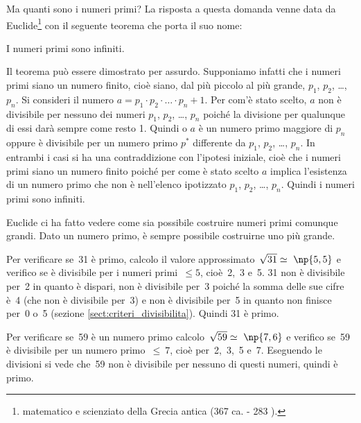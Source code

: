 \ovalbox{\risolvii \ref{ese:1.15},\ref{ese:1.16}}\vspazio

Ma quanti sono i numeri primi? La risposta a questa domanda venne data da Euclide\footnote{matematico e scienziato della Grecia antica (367 \aC{} ca. - 283 \aC).} con il seguente teorema
che porta il suo nome:
\begin{teorema}[di Euclide]
I numeri primi sono infiniti.
\end{teorema}

Il teorema può essere dimostrato per assurdo.
Supponiamo infatti che i numeri primi siano un numero finito, cioè siano, dal più piccolo al più grande, $p_1$, $p_2$, \ldots{}, $p_n$. Si consideri il numero $a=p_1\cdot p_2\cdot \ldots{}\cdot p_n+1$. Per com'è stato scelto, $a$ non è divisibile per nessuno dei numeri $p_1$, $p_2$, \ldots{}, $p_n$ poiché la divisione per qualunque di essi darà sempre come resto 1. Quindi o $a$ è un numero primo maggiore di $p_n$ oppure è divisibile per un numero primo $p^*$ differente da $p_1$, $p_2$, \ldots{}, $p_n$. In entrambi i casi si ha una contraddizione con l'ipotesi iniziale, cioè che i numeri primi siano un numero finito poiché per come è stato scelto $a$ implica l'esistenza di un numero primo che non è nell'elenco ipotizzato $p_1$, $p_2$, \ldots, $p_n$. Quindi i numeri primi sono infiniti.

Euclide ci ha fatto vedere come sia possibile costruire numeri primi comunque grandi. Dato un numero primo,
è sempre possibile costruirne uno più grande.

\vspazio\ovalbox{\risolvi \ref{ese:1.17}}

\begin{exrig}
 \begin{esempio}
 Per verificare se~31 è primo, calcolo il valore approssimato~$\sqrt{31}\simeq~\np{5,5}$ e verifico se è divisibile
per i numeri primi~$\le5$, cioè~2,~3 e~5. 31 non è divisibile per~2 in
quanto è dispari, non è divisibile per~3 poiché la somma delle sue cifre è~4 (che non è divisibile per~3) e
non è divisibile per~5 in quanto non finisce per~0 o~5 (sezione \ref{sect:criteri_divisibilita}). Quindi 31 è primo.
 \end{esempio}

 \begin{esempio}
 Per verificare se~59 è un numero primo calcolo~$\sqrt{59}\simeq~\np{7,6}$ e verifico se~59 è divisibile per un
numero primo~$\le~7$, cioè per~2,~3,~5 e~7. Eseguendo le divisioni si vede che~59 non è divisibile
per nessuno di questi numeri, quindi è primo.
 \end{esempio}
\end{exrig}

